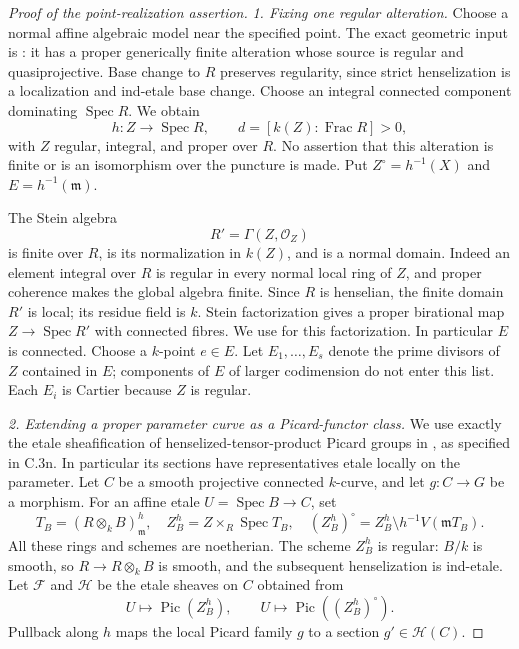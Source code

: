 \begin{proof}[Proof of the point-realization assertion]
\emph{1. Fixing one regular alteration.}
Choose a normal affine algebraic model near the
specified point. The exact geometric input is
\citet[Theorem 4.1 and Remark 4.2, p.~66]{D_DeJong1996Alterations}:
it has a proper generically finite alteration
whose source is regular and quasiprojective.
Base change to $R$ preserves regularity, since
strict henselization is a localization and
ind-etale base change. Choose an integral
connected component dominating
$\operatorname{Spec}R$. We obtain
\[
             h:Z\longrightarrow\operatorname{Spec}R,
             \qquad d=[k(Z):\operatorname{Frac}R]>0,
\]
with $Z$ regular, integral, and proper over $R$.
No assertion that this alteration is finite or
is an isomorphism over the puncture is made.
Put $Z^\circ=h^{-1}(X)$ and $E=h^{-1}(\mathfrak m)$.

The Stein algebra
\[
                         R'=\Gamma(Z,\mathcal O_Z)
\]
is finite over $R$, is its normalization in
$k(Z)$, and is a normal domain. Indeed an
element integral over $R$ is regular in every
normal local ring of $Z$, and proper coherence
makes the global algebra finite. Since $R$ is
henselian, the finite domain $R'$ is local;
its residue field is $k$. Stein factorization
gives a proper birational map
$Z\to\operatorname{Spec}R'$ with connected
fibres. We use
\citet[Theorem 37.53.4]{D_StacksAlterationFamilies}
for this factorization. In particular $E$ is
connected. Choose a $k$-point $e\in E$.
Let $E_1,\ldots,E_s$ denote the prime divisors
of $Z$ contained in $E$; components of $E$
of larger codimension do not enter this list.
Each $E_i$ is Cartier because $Z$ is regular.

\emph{2. Extending a proper parameter curve as a
Picard-functor class.}
We use exactly the etale sheafification of
henselized-tensor-product Picard groups in
\citet[Introduction, Theorem 1 and preceding
definition, p.~VII]{D_Boutot1978}, as specified
in C.3n. In particular its sections have
representatives etale locally on the parameter.
Let $C$ be a smooth projective connected
$k$-curve, and let $g:C\to G$ be a morphism.
For an affine etale $U=\operatorname{Spec}B\to C$,
set
\[
 T_B=(R\otimes_kB)^h_{\mathfrak m},\quad
 Z_B^h=Z\times_R\operatorname{Spec}T_B,
 \quad (Z_B^h)^\circ=Z_B^h\setminus h^{-1}V(\mathfrak mT_B).
\]
All these rings and schemes are noetherian.
The scheme $Z_B^h$ is regular: $B/k$ is smooth,
so $R\to R\otimes_kB$ is smooth, and the
subsequent henselization is ind-etale.
Let $\mathcal F$ and $\mathcal H$ be the etale
sheaves on $C$ obtained from
\[
 U\longmapsto\operatorname{Pic}(Z_B^h),\qquad
 U\longmapsto\operatorname{Pic}((Z_B^h)^\circ).
\]
Pullback along $h$ maps the local Picard family
$g$ to a section $g'\in\mathcal H(C)$.


\end{proof}

